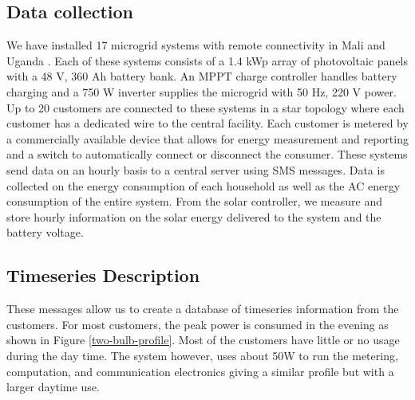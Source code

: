 \documentclass[conference]{IEEEtran}
\begin{document}
\subsection{Data collection}
We have installed 17 microgrid systems with remote connectivity
in Mali and Uganda \cite{ICTD}.
Each of these systems consists of a 1.4 kWp array of photovoltaic
panels with a 48 V, 360 Ah battery bank.
An MPPT charge controller handles battery charging and a
750 W inverter supplies the microgrid with 50 Hz, 220 V power.
Up to 20 customers are connected to these systems in a star
topology where each customer has a dedicated wire to the
central facility.
Each customer is metered by a commercially available device that
allows for energy measurement and reporting and a switch to
automatically connect or disconnect the consumer.
These systems send data on an hourly basis to a central server
using SMS messages.
Data is collected on the energy consumption of each household
as well as the AC energy consumption of the entire system.
From the solar controller, we measure and store hourly information
on the solar energy delivered to the system and the battery
voltage.

\subsection{Timeseries Description}
These messages allow us to create a database of timeseries
information from the customers.
For most customers, the peak power is consumed in the evening
as shown in Figure \ref{two-bulb-profile}.
Most of the customers have little or no usage during the day time.
The system however, uses about 50W to run the metering, computation,
and communication electronics giving a similar profile but with
a larger daytime use.
\end{document}
